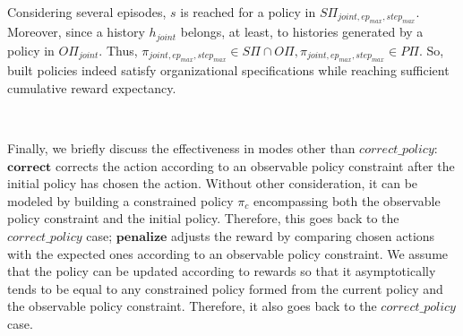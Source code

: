 \begin{proofoutline}
    Considering several episodes, $s$ is reached for a policy in $\allowbreak S\Pi_{joint,ep_{max},step_{max}}$. Moreover, since a history $h_{joint}$ belongs, at least, to histories generated by a policy in $O\Pi_{joint}$. Thus, $\pi_{joint,ep_{max},step_{max}} \in S\Pi \cap O\Pi, \pi_{joint,ep_{max},step_{max}} \in P\Pi$. So, built policies indeed satisfy organizational specifications while reaching sufficient cumulative reward expectancy.

    \

    \noindent Finally, we briefly discuss the effectiveness in modes other than $correct\_policy$:
    $\mathbf{correct}$ corrects the action according to an observable policy constraint after the initial policy has chosen the action. Without other consideration, it can be modeled by building a constrained policy $\pi_c$ encompassing both the observable policy constraint and the initial policy. Therefore, this goes back to the $correct\_policy$ case;
    $\mathbf{penalize}$ adjusts the reward by comparing chosen actions with the expected ones according to an observable policy constraint. We assume that the policy can be updated according to rewards so that it asymptotically tends to be equal to any constrained policy formed from the current policy and the observable policy constraint. Therefore, it also goes back to the $correct\_policy$ case.

\end{proofoutline}